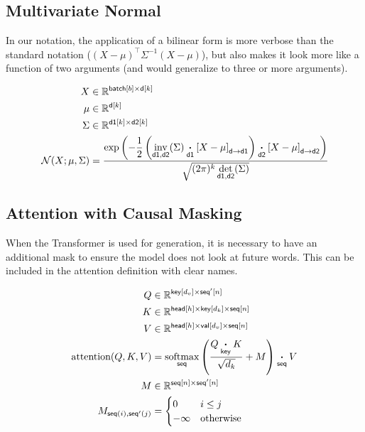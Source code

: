 \documentclass{article}
\newcommand{\reals}{\mathbb{R}}
\begin{document}
\subsection{Multivariate Normal}

In our notation, the application of a bilinear form is more verbose than the standard notation ($(X-\mu)^\top \Sigma^{-1} (X-\mu)$), but also makes it look more like a function of two arguments (and would generalize to three or more arguments).

\begin{align*} 
X &\in \reals^{\nset{batch}{{b}} \times \nset{d}{{k}}}  \\
\mu &\in \reals^{{\nset{d}{{k}}}}  \\
\Sigma & \in   \reals^{{\nset{d1}{{k}} \times \nset{d2}{{k}}}}  \\
{\cal N}(X; \mu, \Sigma) &= \frac{\displaystyle \exp\left(-\frac{1}{2}  \left(\nfun{d1, d2}{inv}(\Sigma) \ndot{d1} \nmov{d}{d1}{X - \mu} \right) \ndot{d2} \nmov{d}{d2}{X - \mu} \right)}{\sqrt{(2 \pi)^k \nfun{d1, d2}{det}(\Sigma)}}
\end{align*}


\subsection{Attention with Causal Masking}

When the Transformer is used for generation, it is necessary to have
an additional mask to ensure the model does not look at future words.
This can be included in the attention definition with clear names.

\begin{align*} 
Q &\in \reals^{\nset{key}{d_v} \times\nset{seq'}{n}}\\
K &\in \reals^{\nset{head}{h} \times\nset{key}{d_k} \times \nset{seq}{n}}\\
V &\in \reals^{\nset{head}{h} \times \nset{val}{d_v} \times \nset{seq}{n}}\\
\text{attention}(Q, K, V) &=  \nfun{seq}{softmax} \left( \frac{Q \ndot{key} K}{\sqrt{d_k}} + M \right) \ndot{seq} V \\
M & \in \reals^{\nset{seq}{n} \times \nset{seq'}{n}} \\
M_{\nidx{seq}{i}, \nidx{seq'}{j}} & = \begin{cases}0 & i \leq j\\
-\infty & \text{otherwise} \end{cases} \\
\end{align*}
\end{document}
